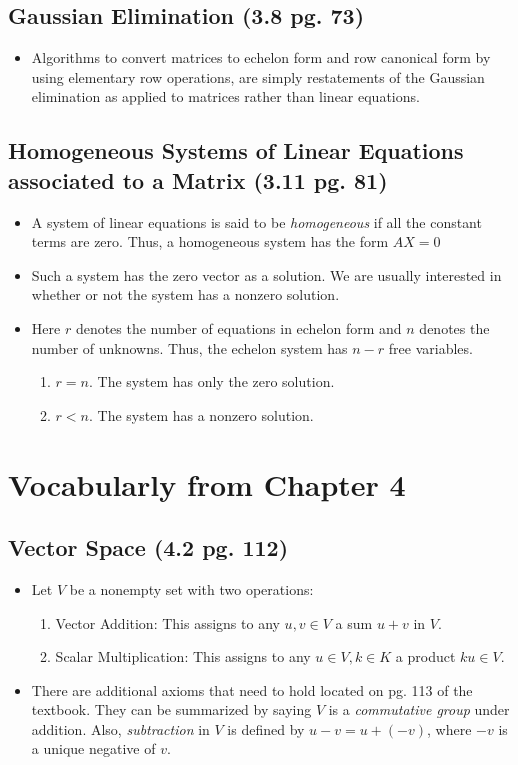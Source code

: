 \documentclass[hidelinks, 11pt, openleft]{scrartcl}
\begin{document}
\subsection*{Gaussian Elimination (3.8 pg. 73)}
\begin{itemize}
    \item Algorithms to convert matrices to echelon form and row canonical form by using elementary row operations, are simply restatements of the Gaussian elimination as applied to matrices rather than linear equations.
\end{itemize}

\subsection*{Homogeneous Systems of Linear Equations associated to a Matrix (3.11 pg. 81)}
\begin{itemize}
    \item A system of linear equations is said to be \textit{homogeneous} if all the constant terms are zero. Thus, a homogeneous system has the form $AX=0$
    \item Such a system has the zero vector as a solution. We are usually interested in whether or not the system has a nonzero solution.
    \item Here $r$ denotes the number of equations in echelon form and $n$ denotes the number of unknowns. Thus, the echelon system has $n-r$ free variables.
    \begin{enumerate}
    \item $r=n$. The system has only the zero solution. 
    \item $r < n$. The system has a nonzero solution. 
    \end{enumerate}
\end{itemize}


\section{Vocabularly from Chapter 4}

    \subsection*{Vector Space (4.2 pg. 112)}
    \begin{itemize}
        \item Let $V$ be a nonempty set with two operations:
        \begin{enumerate}
            \item Vector Addition: This assigns to any $u, v \in V$ a sum $u+v$ in $V$.
            \item Scalar Multiplication: This assigns to any $u \in V, k \in K$ a product $ku \in V$.
        \end{enumerate}
        \item There are additional axioms that need to hold located on pg. 113 of the textbook. They can be summarized by saying $V$ is a \textit{commutative group} under addition. Also, \textit{subtraction} in $V$ is defined by $u-v = u + (-v)$, where $-v$ is a unique negative of $v$.
    \end{itemize}
    
\end{document}
